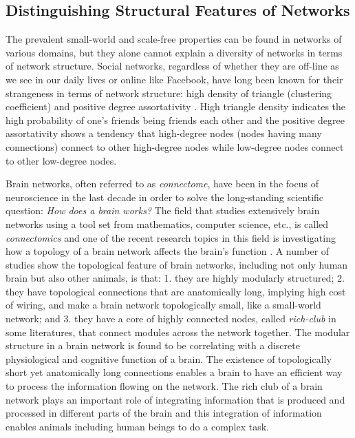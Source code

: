 \documentclass{article}
\begin{document}
	\subsection{Distinguishing Structural Features of Networks}
The prevalent small-world and scale-free properties can be found in networks of various domains, but they alone cannot explain a diversity of networks in terms of network structure. Social networks, regardless of whether they are off-line as we see in our daily lives or online like Facebook, have long been known for their strangeness in terms of network structure: high density of triangle (clustering coefficient) and positive degree assortativity \cite{AssortativeMixing,WhySocialNetworks, Mislove:2007:OnlineSocial}. High triangle density indicates the high probability of one's friends being friends each other and the positive  degree assortativity shows a tendency that high-degree nodes (nodes having many connections) connect to other high-degree nodes while low-degree nodes connect to other low-degree nodes.

Brain networks, often referred to as \textit{connectome}, have been in the focus of neuroscience in the last decade in order to solve the long-standing scientific question: \textit{How does a brain works?}  The field that studies extensively brain networks using a tool set from mathematics, computer science, etc., is called \textit{connectomics} and one of the recent research topics in this field is investigating how a topology of a brain network affects the brain's function \cite{ComparativeConnectome}. A number of studies show the topological feature of brain networks, including not only human brain but also other animals, is that: 1. they are highly modularly structured; 2. they have topological connections that are anatomically long, implying high cost of wiring, and make a brain network topologically small, like a small-world network; and 3. they have a core of highly connected nodes, called \textit{rich-club} in some literatures, that connect modules across the network together. The modular structure in a brain network is found to be correlating with a discrete physiological and cognitive function of a brain. The existence of topologically short yet anatomically long connections enables a brain to have an efficient way to process the information flowing on the network. The rich club of a brain network plays an important role of integrating information that is produced and processed in different parts of the brain and this integration of information enables animals including human beings to do a complex task.
\end{document}
